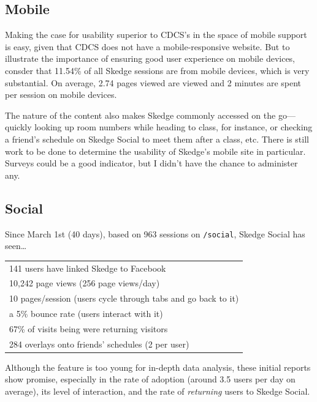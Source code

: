 {\subsection{Mobile}

Making the case for usability superior to CDCS's in the space of mobile support is easy, given that CDCS does not have a mobile-responsive website. But to illustrate the importance of ensuring good user experience on mobile devices, consder that 11.54\% of all Skedge sessions are from mobile devices, which is very substantial. On average, 2.74 pages viewed are viewed and 2 minutes are spent per session on mobile devices.

The nature of the content also makes Skedge commonly accessed on the go---quickly looking up room numbers while heading to class, for instance, or checking a friend's schedule on Skedge Social to meet them after a class, etc. There is still work to be done to determine the usability of Skedge's mobile site in particular. Surveys could be a good indicator, but I didn't have the chance to administer any.

\subsection{Social}

Since March 1st (40 days), based on 963 sessions on {\tt /social}, Skedge Social has seen\ldots

{\renewcommand{\arraystretch}{1.5}
\singlespacing
\begin{center}
\begin{tabular}{l}
  \hline
  141 users have linked Skedge to Facebook \\
  10,242 page views (256 page views/day)  \\
  10 pages/session (users cycle through tabs and go back to it) \\
  a 5\% bounce rate (users interact with it) \\
  67\% of visits being were returning visitors \\
  284 overlays onto friends’ schedules (2 per user) \\
  \hline
\end{tabular}
\end{center}
\doublespacing

\vspace{5pt}

\noindent Although the feature is too young for in-depth data analysis, these initial reports show promise, especially in the rate of adoption (around 3.5 users per day on average), its level of interaction, and the rate of \emph{returning} users to Skedge Social.

}}

